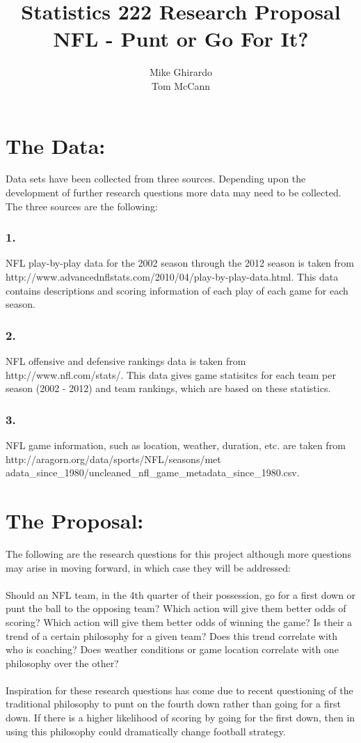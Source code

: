 \documentclass{article}
\begin{document}
\pagestyle{fancy}
\title{\bf Statistics 222 Research Proposal\\NFL - Punt or Go For It?}
\author{ Mike Ghirardo\\ Tom McCann}
\maketitle
\section*{The Data: }
Data sets have been collected from three sources.  Depending upon the development of further research questions more data may need to be collected. The three sources are the following:
\subsubsection*{1.}
NFL play-by-play data for the 2002 season through the 2012 season is taken from http://www.advancednflstats.com/2010/04/play-by-play-data.html. This data contains descriptions and scoring information of each play of each game for each season.
\subsubsection*{2.}
NFL offensive and defensive rankings data is taken from http://www.nfl.com/stats/. This data gives game statisitcs for each team per season (2002 - 2012) and team rankings, which are based on these statistics. 
\subsubsection*{3.}
NFL game information, such as location, weather, duration, etc. are taken from http://aragorn.org/data/sports/NFL/seasons/met
adata\_since\_1980/uncleaned\_nfl\_game\_metadata\_since\_1980.csv.

\section*{The Proposal: }
The following are the research questions for this project although more questions may arise in moving forward, in which case they will be addressed:\\
\smallskip\\
Should an NFL team, in the 4th quarter of their possession, go for a first down or punt the ball to the opposing team?  Which action will give them better odds of scoring? Which action will give them better odds of winning the game? Is their a trend of a certain philosophy  for a given team? Does this trend correlate with who is coaching? Does weather conditions or game location correlate with one philosophy over the other?\\
\smallskip\\
Inspiration for these research questions has come due to recent questioning of the traditional philosophy to punt on the fourth down rather than going for a first down. If there is a higher likelihood of scoring by going for the first down, then in using this philosophy could dramatically change football strategy. 
\end{document}
